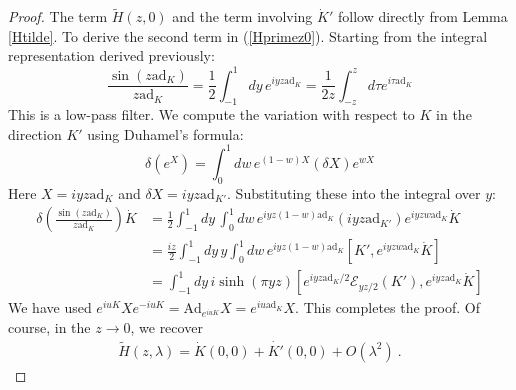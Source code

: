 \documentclass[a4paper,11pt]{article}
\theoremstyle{definition}
\newcommand{\ad}{\text{ad}}
\newcommand{\Ad}{\text{Ad}}
\begin{document}
\begin{proof}
The term $\tilde{H}(z,0)$ and the term involving $\dot{K}'$ follow directly from Lemma \ref{Htilde}. To derive the second term in (\ref{Hprimez0}). 
Starting from the integral representation derived previously:
\begin{equation}
    \frac{\sin(z \ad_K)}{z \ad_K} = \frac{1}{2} \int_{-1}^1 dy \, e^{iy z \ad_K}=\frac{1}{2z}\int_{-z}^z d\tau e^{i\tau \ad_K}
\end{equation}
This is a low-pass filter. 
We compute the variation with respect to $K$ in the direction $K'$ using Duhamel's formula:
\begin{equation}
    \delta \left( e^{X} \right) = \int_0^1 dw \, e^{(1-w)X} (\delta X) e^{wX}
\end{equation}
Here $X = iy z \ad_K$ and $\delta X = iy z \ad_{K'}$. Substituting these into the integral over $y$:
\begin{align}
    \delta \left( \frac{\sin(z \ad_K)}{z \ad_K} \right) \dot{K} &= \frac{1}{2} \int_{-1}^1 dy \, \int_0^1 dw \, e^{iyz(1-w)\ad_K} (iyz \ad_{K'}) e^{iyzw\ad_K} \dot{K} \\
    &= \frac{iz}{2} \int_{-1}^1 dy \, y \int_0^1 dw \, e^{iyz(1-w)\ad_K} \left[ K', e^{iyzw\ad_K} \dot{K} \right]\\
    &= \int_{-1}^1 dy \, i\sinh(\pi y z) [e^{iyz\ad_K/2} \mathcal{E}_{yz/2}(K'), e^{iyz\ad_K} \dot{K}]
\end{align}
{We have used $e^{i u K} X e^{-i u K} = \Ad_{e^{i u K}} X = e^{i u \ad_K} X$}.
This completes the proof. Of course, in the $z\to 0$, we recover 
\begin{eqnarray}
    \tilde{H}(z,\lambda)=\dot{K}(0,0)+\dot{K'}(0,0)+O(\lambda^2)\ .
\end{eqnarray}
\end{proof}
\end{document}
